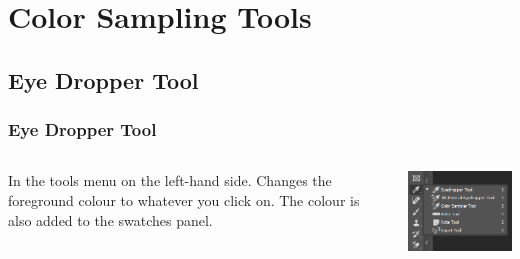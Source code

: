 \documentclass{beamer}
\begin{document}
	\section{Color Sampling Tools}
			\subsection{Eye Dropper Tool}		
	\begin{frame}
		\frametitle{Eye Dropper Tool}
			\begin{columns}
			\vspace{-25pt}
				\begin{outline}
					\1 In the tools menu on the left-hand side.
					\1 Changes the foreground colour to whatever you click on.
					\1 The colour is also added to the swatches panel.
				\end{outline}
				\includegraphics[width=1.0\textwidth]{images/Eye Dropper Tool.png}
			\end{columns}
		\end{frame}
\end{document}
